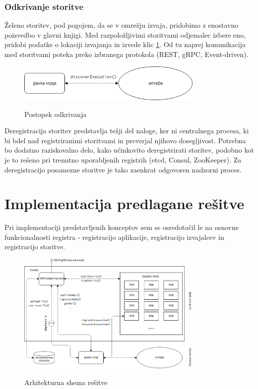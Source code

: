 \documentclass[a4paper, 12pt]{book}
\begin{document}
\subsection{Odkrivanje storitve}
\label{serviceDiscovery}
Želeno storitev, pod pogojem, da se v omrežju izvaja, pridobimo z enostavno poizvedbo v glavni knjigi.
Med razpoložljivimi storitvami odjemalec izbere eno, pridobi podatke o lokaciji izvajanja in izvede klic \ref{discover_service}.
Od tu naprej komunikacija med storitvami poteka preko izbranega protokola (REST, gRPC, Event-driven).

\begin{figure}[h]
	\centering
	\includegraphics[width=0.8\textwidth]{slike/discover_service.png}
	\label{discover_service}
	\caption{Postopek odkrivanja}
\end{figure}

Deregistracija storitev predstavlja težji del naloge, ker ni centralnega procesa, ki bi bdel nad registriranimi storitvami in preverjal njihovo dosegljivost.
Potrebna bo dodatno raziskovalno delo, kako učinkovito deregistrirati storitev, podobno kot je to rešeno pri trenutno uporabljenih registrih (etcd, Consul, ZooKeeper).
Za deregistracijo posamezne storitve je tako zaenkrat odgovoren nadzorni proces.

\chapter{Implementacija predlagane rešitve}
\label{ch5}

Pri implementaciji predstavljenih konceptov sem se osredotočil le na osnovne funkcionalnosti registra - registracijo aplikacije, registracijo izvajalcev in registracijo storitve.

\begin{figure}[h]
\includegraphics[width=0.8\textwidth]{slike/dApi_sl.png}
\label{scheme}
\caption{Arhitekturna shema rešitve}
\end{figure}
\end{document}
